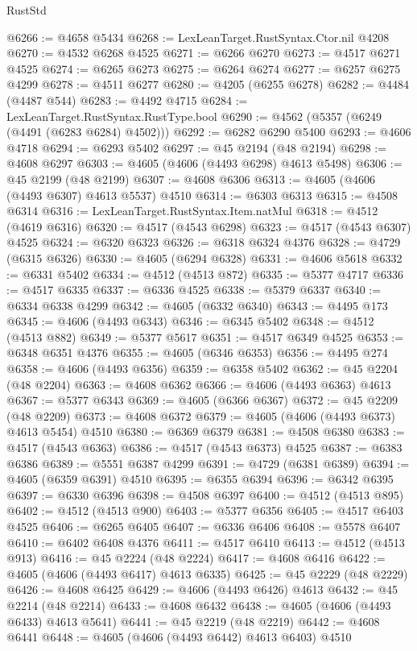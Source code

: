 \begin{lexlean}{RustStd}
\begin{coremodule}
@6266 := @4658 @5434
@6268 := LexLeanTarget.RustSyntax.Ctor.nil @4208
@6270 := @4532 @6268 @4525
@6271 := @6266 @6270
@6273 := @4517 @6271 @4525
@6274 := @6265 @6273
@6275 := @6264 @6274
@6277 := @6257 @6275 @4299
@6278 := @4511 @6277
@6280 := @4205 (@6255 @6278)
@6282 := @4484 (@4487 @544)
@6283 := @4492 @4715
@6284 := LexLeanTarget.RustSyntax.RustType.bool
@6290 := @4562 (@5357 (@6249 (@4491 (@6283 @6284) @4502)))
@6292 := @6282 @6290 @5400
@6293 := @4606 @4718
@6294 := @6293 @5402
@6297 := @45 @2194 (@48 @2194)
@6298 := @4608 @6297
@6303 := @4605 (@4606 (@4493 @6298) @4613 @5498)
@6306 := @45 @2199 (@48 @2199)
@6307 := @4608 @6306
@6313 := @4605 (@4606 (@4493 @6307) @4613 @5537) @4510
@6314 := @6303 @6313
@6315 := @4508 @6314
@6316 := LexLeanTarget.RustSyntax.Item.natMul
@6318 := @4512 (@4619 @6316)
@6320 := @4517 (@4543 @6298)
@6323 := @4517 (@4543 @6307) @4525
@6324 := @6320 @6323
@6326 := @6318 @6324 @4376
@6328 := @4729 (@6315 @6326)
@6330 := @4605 (@6294 @6328)
@6331 := @4606 @5618
@6332 := @6331 @5402
@6334 := @4512 (@4513 @872)
@6335 := @5377 @4717
@6336 := @4517 @6335
@6337 := @6336 @4525
@6338 := @5379 @6337
@6340 := @6334 @6338 @4299
@6342 := @4605 (@6332 @6340)
@6343 := @4495 @173
@6345 := @4606 (@4493 @6343)
@6346 := @6345 @5402
@6348 := @4512 (@4513 @882)
@6349 := @5377 @5617
@6351 := @4517 @6349 @4525
@6353 := @6348 @6351 @4376
@6355 := @4605 (@6346 @6353)
@6356 := @4495 @274
@6358 := @4606 (@4493 @6356)
@6359 := @6358 @5402
@6362 := @45 @2204 (@48 @2204)
@6363 := @4608 @6362
@6366 := @4606 (@4493 @6363) @4613
@6367 := @5377 @6343
@6369 := @4605 (@6366 @6367)
@6372 := @45 @2209 (@48 @2209)
@6373 := @4608 @6372
@6379 := @4605 (@4606 (@4493 @6373) @4613 @5454) @4510
@6380 := @6369 @6379
@6381 := @4508 @6380
@6383 := @4517 (@4543 @6363)
@6386 := @4517 (@4543 @6373) @4525
@6387 := @6383 @6386
@6389 := @5551 @6387 @4299
@6391 := @4729 (@6381 @6389)
@6394 := @4605 (@6359 @6391) @4510
@6395 := @6355 @6394
@6396 := @6342 @6395
@6397 := @6330 @6396
@6398 := @4508 @6397
@6400 := @4512 (@4513 @895)
@6402 := @4512 (@4513 @900)
@6403 := @5377 @6356
@6405 := @4517 @6403 @4525
@6406 := @6265 @6405
@6407 := @6336 @6406
@6408 := @5578 @6407
@6410 := @6402 @6408 @4376
@6411 := @4517 @6410
@6413 := @4512 (@4513 @913)
@6416 := @45 @2224 (@48 @2224)
@6417 := @4608 @6416
@6422 := @4605 (@4606 (@4493 @6417) @4613 @6335)
@6425 := @45 @2229 (@48 @2229)
@6426 := @4608 @6425
@6429 := @4606 (@4493 @6426) @4613
@6432 := @45 @2214 (@48 @2214)
@6433 := @4608 @6432
@6438 := @4605 (@4606 (@4493 @6433) @4613 @5641)
@6441 := @45 @2219 (@48 @2219)
@6442 := @4608 @6441
@6448 := @4605 (@4606 (@4493 @6442) @4613 @6403) @4510

\end{coremodule}
\end{lexlean}
